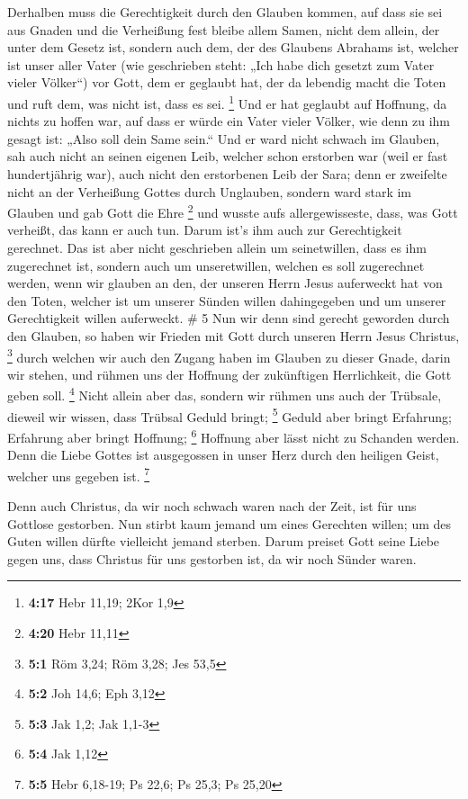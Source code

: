  Derhalben muss die Gerechtigkeit durch den Glauben
kommen, auf dass sie sei aus Gnaden und die Verheißung fest bleibe allem
Samen, nicht dem allein, der unter dem Gesetz ist, sondern auch dem, der
des Glaubens Abrahams ist, welcher ist unser aller Vater 
(wie geschrieben steht: „Ich habe dich gesetzt zum Vater vieler
Völker``) vor Gott, dem er geglaubt hat, der da lebendig macht die Toten
und ruft dem, was nicht ist, dass es sei. \footnote{\textbf{4:17} Hebr
  11,19; 2Kor 1,9}  Und er hat geglaubt auf Hoffnung, da
nichts zu hoffen war, auf dass er würde ein Vater vieler Völker, wie
denn zu ihm gesagt ist: „Also soll dein Same sein.``  Und
er ward nicht schwach im Glauben, sah auch nicht an seinen eigenen Leib,
welcher schon erstorben war (weil er fast hundertjährig war), auch nicht
den erstorbenen Leib der Sara;  denn er zweifelte nicht
an der Verheißung Gottes durch Unglauben, sondern ward stark im Glauben
und gab Gott die Ehre \footnote{\textbf{4:20} Hebr 11,11}
 und wusste aufs allergewisseste, dass, was Gott
verheißt, das kann er auch tun.  Darum ist's ihm auch zur
Gerechtigkeit gerechnet.  Das ist aber nicht geschrieben
allein um seinetwillen, dass es ihm zugerechnet ist, 
sondern auch um unseretwillen, welchen es soll zugerechnet werden, wenn
wir glauben an den, der unseren Herrn Jesus auferweckt hat von den
Toten,  welcher ist um unserer Sünden willen dahingegeben
und um unserer Gerechtigkeit willen auferweckt. \# 5  Nun
wir denn sind gerecht geworden durch den Glauben, so haben wir Frieden
mit Gott durch unseren Herrn Jesus Christus, \footnote{\textbf{5:1} Röm
  3,24; Röm 3,28; Jes 53,5}  durch welchen wir auch den
Zugang haben im Glauben zu dieser Gnade, darin wir stehen, und rühmen
uns der Hoffnung der zukünftigen Herrlichkeit, die Gott geben soll.
\footnote{\textbf{5:2} Joh 14,6; Eph 3,12}  Nicht allein
aber das, sondern wir rühmen uns auch der Trübsale, dieweil wir wissen,
dass Trübsal Geduld bringt; \footnote{\textbf{5:3} Jak 1,2; Jak 1,1-3}
 Geduld aber bringt Erfahrung; Erfahrung aber bringt
Hoffnung; \footnote{\textbf{5:4} Jak 1,12}  Hoffnung aber
lässt nicht zu Schanden werden. Denn die Liebe Gottes ist ausgegossen in
unser Herz durch den heiligen Geist, welcher uns gegeben ist.
\footnote{\textbf{5:5} Hebr 6,18-19; Ps 22,6; Ps 25,3; Ps 25,20}

 Denn auch Christus, da wir noch schwach waren nach der
Zeit, ist für uns Gottlose gestorben.  Nun stirbt kaum
jemand um eines Gerechten willen; um des Guten willen dürfte vielleicht
jemand sterben.  Darum preiset Gott seine Liebe gegen uns,
dass Christus für uns gestorben ist, da wir noch Sünder waren.

